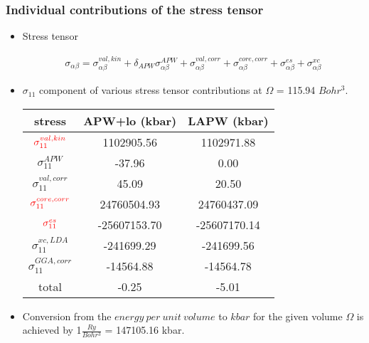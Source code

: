 \documentclass[10pt, handout]{beamer}
\newcommand{\sig}{\sigma}
\newcommand{\al}{\alpha}
\newcommand{\nologo}{\setbeamertemplate{logo}{}}  %
\begin{document}
		{\nologo
			\begin{frame}
				\frametitle{ Individual contributions of the stress tensor }
				
				\begin{itemize}
					\item Stress tensor
					
					\begin{eqnarray}\nonumber
						\sig_{\al\beta} =	\sig_{\al\beta}^{val, kin} + \delta_{APW}\sig_{\al\beta}^{APW} + \sig_{\al\beta}^{val,corr} + \sig_{\al\beta}^{core,corr} + \sig_{\al\beta}^{es} + \sig_{\al\beta}^{xc}
					\end{eqnarray}
					
					\item $\sigma_{11}$ component of various stress tensor contributions at $\Omega$ = 115.94 $Bohr^3$.
					\begin{table}	
						\begin{tabular}{c c c}
							\hline\hline
							stress                      & APW+lo (kbar)     & LAPW (kbar)  \\[0.5ex]
							\hline
							${\color{red}\sigma^{val,kin}_{11}}$     &  {\color{red}1102905.56}      & {\color{red}1102971.88} \\[1ex]
							
							$\sigma^{APW}_{11}$         &  -37.96          & 0.00 \\[1ex]
							
							$\sigma^{val,corr}_{11}$    &  45.09           & 20.50 \\[1ex]
							
							${\color{red}\sigma^{core,corr}_{11}}$   & {\color{red} 24760504.93}      & {\color{red} 24760437.09}  \\[1ex]
							
							${\color{red}\sigma^{es}_{11}}$          & {\color{red}-25607153.70}     & {\color{red}-25607170.14} \\[1ex]
							
							$\sigma^{xc, LDA}_{11}$     & -241699.29       &  -241699.56 \\[1ex]
							
							$\sigma^{GGA,corr}_{11}$    & -14564.88        & -14564.78 \\[1ex]	 		
							
							{\color{blue} total}        &  {\color{blue} -0.25}   & {\color{blue} -5.01}     \\
							\hline\hline
						\end{tabular}
					\end{table}
					\item Conversion from the $energy\ per\ unit\ volume$ to $kbar$ for the given volume $\Omega$ is achieved by 1$\frac{Ry}{Bohr^3}$ = 147105.16 kbar.
					
				\end{itemize}	     
			\end{frame}
		}
		
\end{document}
